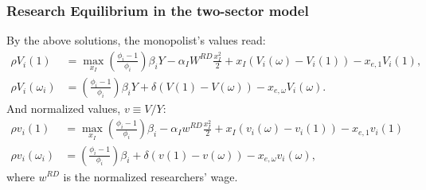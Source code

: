 \subsubsection{Research Equilibrium in the two-sector model}

By the above solutions, the monopolist's values read:
\begin{align*}
\rho V_{i}^ {}(1) & =\max_{x_{I}}\left(\frac{\phi_{i}-1}{\phi_{i}}\right)\beta_{i}Y-\alpha_{I}W^{RD}\frac{x_{I}^{2}}{2}+x_{I}\left(V_{i}(\omega)-V_{i}(1)\right)-x_{e,1}V_{i}(1),\\
\rho V_{i}^ {}(\omega_{i}) & =\left(\frac{\phi_{i}-1}{\phi_{i}}\right)\beta_{i}Y+\delta\left(V(1)-V(\omega)\right)-x_{e,\omega}V_{i}(\omega).
\end{align*}
And normalized values, $v\equiv V/Y:$
\begin{align}
\rho v_{i}(1) & =\max_{x_{I}}\left(\frac{\phi_{i}-1}{\phi_{i}}\right)\beta_{i}-\alpha_{I}w^{RD}\frac{x_{I}^{2}}{2}+x_{I}\left(v_{i}(\omega)-v_{i}(1)\right)-x_{e,1}v_{i}(1)\label{eq: normV1}\\
\rho v_{i}(\omega_{i}) & =\left(\frac{\phi_{i}-1}{\phi_{i}}\right)\beta_{i}+\delta\left(v(1)-v(\omega)\right)-x_{e,\omega}v_{i}(\omega),\label{eq: normV2}
\end{align}
where $w^{RD}$ is the normalized researchers' wage.


